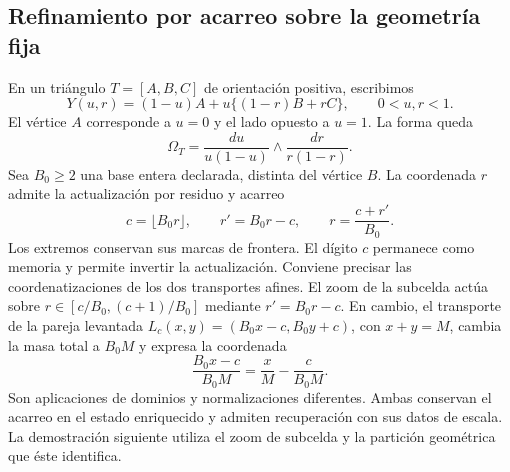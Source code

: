 \subsection{Refinamiento por acarreo sobre la geometría fija}

En un triángulo \(T=[A,B,C]\) de orientación positiva, escribimos
\begin{equation}
 Y(u,r)=(1-u)A+u\{(1-r)B+rC\},\qquad 0<u,r<1.
 \label{eq:polygon-blowdown}
\end{equation}
El vértice \(A\) corresponde a \(u=0\) y el lado opuesto a \(u=1\).
La forma queda
\begin{equation}
 \Omega_T=\frac{du}{u(1-u)}\wedge\frac{dr}{r(1-r)}.
 \label{eq:polygon-product-form}
\end{equation}
Sea \(B_0\geq2\) una base entera declarada, distinta del vértice \(B\).
La coordenada \(r\) admite la actualización por residuo y acarreo
\begin{equation}
 c=\lfloor B_0r\rfloor,\qquad r'=B_0r-c,\qquad
 r=\frac{c+r'}{B_0}.
 \label{eq:polygon-carry}
\end{equation}
Los extremos conservan sus marcas de frontera. El dígito \(c\) permanece
como memoria y permite invertir la actualización. Conviene precisar las
coordenatizaciones de los dos transportes afines. El zoom de la subcelda actúa sobre
\(r\in[c/B_0,(c+1)/B_0]\) mediante \(r'=B_0r-c\).
En cambio, el transporte de la pareja levantada
\(L_c(x,y)=(B_0x-c,B_0y+c)\), con \(x+y=M\), cambia la masa total
a \(B_0M\) y expresa la coordenada
\[
 \frac{B_0x-c}{B_0M}=\frac{x}{M}-\frac{c}{B_0M}.
\]
Son aplicaciones de dominios y normalizaciones diferentes. Ambas conservan
el acarreo en el estado enriquecido y admiten recuperación con sus datos
de escala. La demostración siguiente utiliza el zoom de subcelda y la
partición geométrica que éste identifica.

